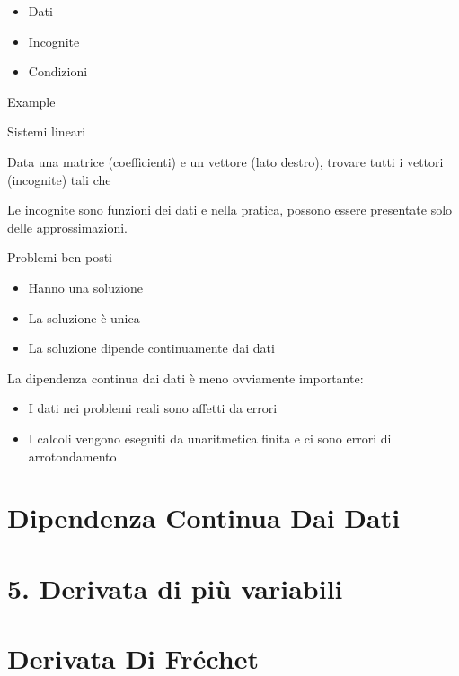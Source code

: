 \documentclass[
]{article}
\providecommand{\tightlist}{%
  \setlength{\itemsep}{0pt}\setlength{\parskip}{0pt}}
\begin{document}
\begin{itemize}
\tightlist
\item
  Dati
\item
  Incognite
\item
  Condizioni
\end{itemize}

Example

Sistemi lineari

Data una matrice {} (coefficienti) e un vettore {} (lato destro),
trovare tutti i vettori {} (incognite) tali che {}

Le incognite sono funzioni dei dati e nella pratica, possono essere
presentate solo delle approssimazioni.

Problemi ben posti

\begin{itemize}
\tightlist
\item
  Hanno una soluzione
\item
  La soluzione è unica
\item
  La soluzione dipende continuamente dai dati
\end{itemize}

La dipendenza continua dai dati è meno ovviamente importante:

\begin{itemize}
\tightlist
\item
  I dati nei problemi reali sono affetti da errori
\item
  I calcoli vengono eseguiti da un\textquotesingle aritmetica finita e
  ci sono errori di arrotondamento
\end{itemize}

\hypertarget{dipendenza-continua-dai-dati}{%
\section{Dipendenza Continua Dai
Dati}\label{dipendenza-continua-dai-dati}}

\hypertarget{derivata-di-piuxf9-variabili}{%
\section{5. Derivata di più
variabili}\label{derivata-di-piuxf9-variabili}}

\hypertarget{derivata-di-fruxe9chet}{%
\section{Derivata Di Fréchet}\label{derivata-di-fruxe9chet}}
\end{document}
